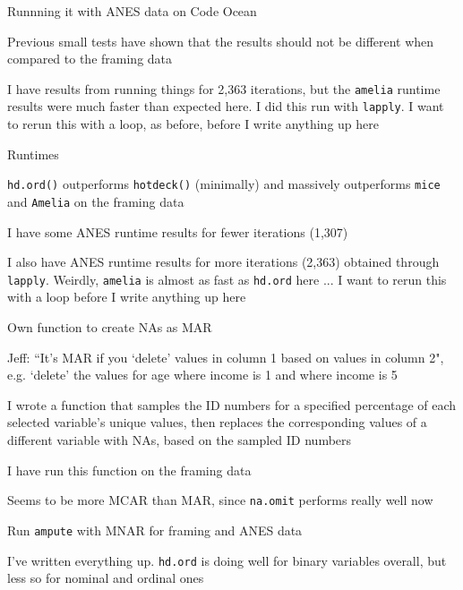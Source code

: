 \begin{coi}
\begin{coi}
			\end{coi}
		\item Runnning it with ANES data on Code Ocean
			\begin{coi}
				\item Previous small tests have shown that the results should not be different when compared to the framing data
				\item I have results from running things for 2,363 iterations, but the \texttt{amelia} runtime results were much faster than expected here. I did this run with \texttt{lapply}. I want to rerun this with a loop, as before, before I write anything up here
			\end{coi}
		\item Runtimes
			\begin{coi}
				\item \texttt{hd.ord()} outperforms \texttt{hotdeck()} (minimally) and massively outperforms \texttt{mice} and \texttt{Amelia} on the framing data
				\item I have some ANES runtime results for fewer iterations (1,307)
				\item I also have ANES runtime results for more iterations (2,363) obtained through \texttt{lapply}. Weirdly, \texttt{amelia} is almost as fast as \texttt{hd.ord} here ... I want to rerun this with a loop before I write anything up here
			\end{coi}
		\item Own function to create NAs as MAR
			\begin{coi}
				\item Jeff: ``It's MAR if you `delete' values in column 1 based on values in column 2", e.g. `delete' the values for age where income is 1 and where income is 5
				\item I wrote a function that samples the ID numbers for a specified percentage of each selected variable's unique values, then replaces the corresponding values of a different variable with NAs, based on the sampled ID numbers
				\item I have run this function on the framing data
				\item Seems to be more MCAR than MAR, since \texttt{na.omit} performs really well now
			\end{coi}
		\item Run \texttt{ampute} with MNAR for framing and ANES data
			\begin{coi}
				\item I've written everything up. \texttt{hd.ord} is doing well for binary variables overall, but less so for nominal and ordinal ones

\end{coi}
\end{coi}
